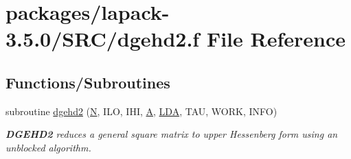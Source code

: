 \hypertarget{dgehd2_8f}{}\section{packages/lapack-\/3.5.0/\+S\+R\+C/dgehd2.f File Reference}
\label{dgehd2_8f}
\subsection*{Functions/\+Subroutines}
\begin{DoxyCompactItemize}
\item 
subroutine \hyperlink{group__doubleGEcomputational_ga976b17056c80d4aeed6438b4118d114a}{dgehd2} (\hyperlink{polmisc_8c_a0240ac851181b84ac374872dc5434ee4}{N}, I\+L\+O, I\+H\+I, \hyperlink{classA}{A}, \hyperlink{example__user_8c_ae946da542ce0db94dced19b2ecefd1aa}{L\+D\+A}, T\+A\+U, W\+O\+R\+K, I\+N\+F\+O)
\begin{DoxyCompactList}\small\item\em {\bfseries D\+G\+E\+H\+D2} reduces a general square matrix to upper Hessenberg form using an unblocked algorithm. \end{DoxyCompactList}\end{DoxyCompactItemize}

